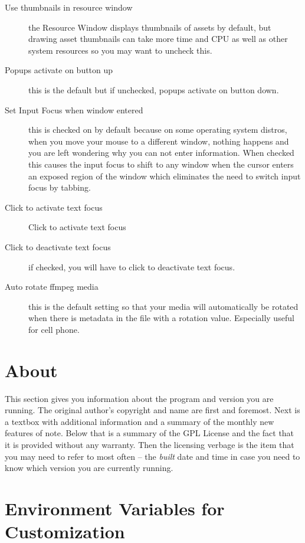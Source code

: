 \begin{description}
    \item[Use thumbnails in resource window]  the Resource Window displays thumbnails of assets by default, but drawing asset thumbnails can take more time and CPU as well as other system resources so you may want to uncheck this.   
    \item[Popups activate on button up]  this is the default but if unchecked, popups activate on button down.
    \item[Set Input Focus when window entered]  this is checked on by default because on some operating system distros, when you move your mouse to a different window, nothing happens and you are left wondering why you can not enter information.  When checked this causes the input focus to shift to any \CGG{} window when the cursor enters an exposed region of the window which eliminates the need to switch input focus by tabbing. 
    \item[Click to activate text focus]  Click to activate text focus
    \item [Click to deactivate text focus]  if checked, you will have to click to deactivate text focus.
    \item [Auto rotate ffmpeg media]  this is the default setting so that your media will automatically be rotated when there is metadata in the file with a rotation value.  Especially useful for cell phone.    
\end{description}

\section{About}%
\label{sec:about}

This section gives you information about the \CGG{} program and version you are running.  The original author’s copyright and name are first and foremost.  Next is a textbox with additional information and a summary of the monthly new features of note. Below that is a summary of the GPL License and the fact that it is provided without any warranty.  Then the licensing verbage is the item that you may need to refer to most often -- the \textit{built} date and time in case you need to know which version you are currently running.

\section{Environment Variables for Customization}%
\label{sec:environment_variables_customization}


